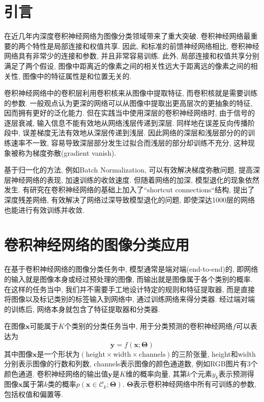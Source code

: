 \section{引言}
在近几年内深度卷积神经网络为图像分类领域带来了重大突破. 卷积神经网络最重要的两个特性是局部连接和权值共享. 因此, 和标准的前馈神经网络相比, 卷积神经网络具有非常少的连接和参数, 并且非常容易训练. 此外, 局部连接和权值共享分别满足了两个假设, 图像中距离近的像素之间的相关性远大于距离远的像素之间的相关性, 图像中的特征属性是和位置无关的. 

卷积神经网络中的卷积层利用卷积核来从图像中提取特征, 而卷积核就是需要训练的参数. 一般观点认为更深的网络可以从图像中提取出更高层次的更抽象的特征, 因而拥有更好的泛化能力. 但在实践当中使用深层的卷积神经网络时, 由于信号的逐层衰减, 输入信息不能有效地从网络浅层传递到深层. 同样地在误差反向传播阶段中, 误差梯度无法有效地从深层传递到浅层. 因此网络的深层和浅层部分的的训练速率不一致, 容易导致深层部分发生过拟合而浅层的部分却训练不充分, 这种现象被称为梯度弥散(gradient vanish)\cite{Glorot2010UnderstandingTD}.

基于归一化的方法, 例如Batch Normalization\cite{Ioffe2015BatchNA}, 可以有效解决梯度弥散问题, 提高深层神经网络的表现, 加速训练的收敛速度. 但随着网络的加深, 模型退化的现象依然发生. 有研究在卷积神经网络的基础上加入了``shortcut connections``结构, 提出了深度残差网络, 有效解决了网络过深导致模型退化的问题, 即使深达1000层的网络也能进行有效训练并收敛.

\section{卷积神经网络的图像分类应用}
在基于卷积神经网络的图像分类任务中, 模型通常是端对端(end-to-end)的, 即网络的输入就是图像本身或经过预处理的图像, 而输出就是图像属于各个类别的概率. 在这样的任务当中, 我们并不需要手工地设计特定的规则和特征提取器, 而是直接将图像以及标记类别的标签输入到网络中, 通过训练网络来得分类器. 经过端对端的训练后, 网络本身就包含了特征提取器和分类器.

在图像$\boldsymbol{x}$可能属于$K$个类别的分类任务当中, 用于分类预测的卷积神经网络$f$可以表达为
\begin{equation}
    \boldsymbol{y} = f(\boldsymbol{x}; \boldsymbol{\Theta}) \label{predict}
\end{equation}
其中图像$\boldsymbol{x}$是一个形状为$(\text{height}\times \text{width}\times \text{channels})$的三阶张量, height和width分别表示图像的行数和列数, channels表示图像的颜色通道数, 例如RGB图片有3个颜色通道. 卷积神经网络的输出值$\boldsymbol{y}$是$K$维的概率向量, 其第$k$个元素$y_k$表示预测得图像$\boldsymbol{x}$属于第$k$类的概率$p(\boldsymbol{x} \in \mathcal{C}_k ; \boldsymbol{\Theta})$. $\boldsymbol{\Theta}$表示卷积神经网络中所有可训练的参数, 包括权值和偏置等. 

